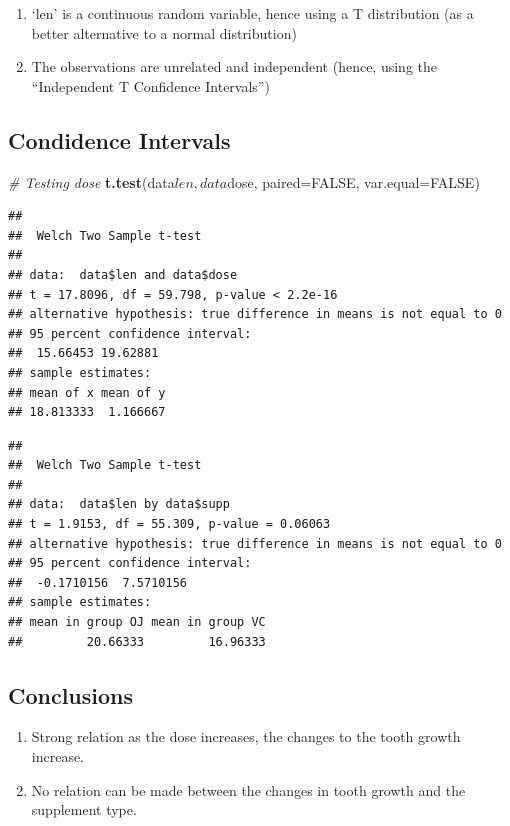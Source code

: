 \documentclass[]{article}
\newenvironment{Shaded}{\begin{snugshade}}{\end{snugshade}}
\newcommand{\KeywordTok}[1]{\textcolor[rgb]{0.13,0.29,0.53}{\textbf{{#1}}}}
\newcommand{\DataTypeTok}[1]{\textcolor[rgb]{0.13,0.29,0.53}{{#1}}}
\newcommand{\StringTok}[1]{\textcolor[rgb]{0.31,0.60,0.02}{{#1}}}
\newcommand{\CommentTok}[1]{\textcolor[rgb]{0.56,0.35,0.01}{\textit{{#1}}}}
\newcommand{\OtherTok}[1]{\textcolor[rgb]{0.56,0.35,0.01}{{#1}}}
\newcommand{\NormalTok}[1]{{#1}}
\begin{document}
\begin{enumerate}
\def\labelenumi{\arabic{enumi}.}
\itemsep1pt\parskip0pt
\item
  `len' is a continuous random variable, hence using a T distribution
  (as a better alternative to a normal distribution)
\item
  The observations are unrelated and independent (hence, using the
  ``Independent T Confidence Intervals'')
\end{enumerate}

\subsection{Condidence Intervals}\label{condidence-intervals}

\begin{Shaded}
\begin{Highlighting}[]
\CommentTok{# Testing dose}
\KeywordTok{t.test}\NormalTok{(data$len, data$dose, }\DataTypeTok{paired=}\OtherTok{FALSE}\NormalTok{, }\DataTypeTok{var.equal=}\OtherTok{FALSE}\NormalTok{)}
\end{Highlighting}
\end{Shaded}

\begin{verbatim}
## 
##  Welch Two Sample t-test
## 
## data:  data$len and data$dose
## t = 17.8096, df = 59.798, p-value < 2.2e-16
## alternative hypothesis: true difference in means is not equal to 0
## 95 percent confidence interval:
##  15.66453 19.62881
## sample estimates:
## mean of x mean of y 
## 18.813333  1.166667
\end{verbatim}

\begin{Shaded}
\end{Shaded}

\begin{verbatim}
## 
##  Welch Two Sample t-test
## 
## data:  data$len by data$supp
## t = 1.9153, df = 55.309, p-value = 0.06063
## alternative hypothesis: true difference in means is not equal to 0
## 95 percent confidence interval:
##  -0.1710156  7.5710156
## sample estimates:
## mean in group OJ mean in group VC 
##         20.66333         16.96333
\end{verbatim}

\subsection{Conclusions}\label{conclusions}

\begin{enumerate}
\def\labelenumi{\arabic{enumi}.}
\itemsep1pt\parskip0pt
\item
  Strong relation as the dose increases, the changes to the tooth growth
  increase.
\item
  No relation can be made between the changes in tooth growth and the
  supplement type.
\end{enumerate}
\end{document}
